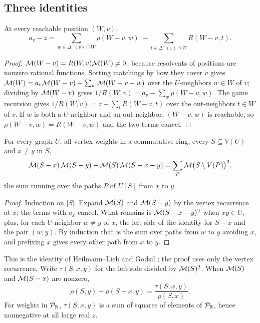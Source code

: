 \subsection{Three identities}

\begin{lemma}\label{lem:cavity}
At every reachable position $(W,v)$,
\[
a_v-z=\sum_{w\in\Delta^{-}(v)\cap W}\rho(W-v,w)\;-\sum_{t\in\Delta^{+}(v)\cap W}R(W-v,t).
\]
\end{lemma}
\begin{proof}
$\mathcal{M}(W-v)=R(W,v)\mathcal{M}(W)\neq0$, because resolvents of positions are nonzero rational functions. Sorting matchings by how they cover $v$ gives $\mathcal{M}(W)=a_v\mathcal{M}(W-v)-\sum_{w}\mathcal{M}(W-v-w)$ over the $U$-neighbors $w\in W$ of $v$; dividing by $\mathcal{M}(W-v)$ gives $1/R(W,v)=a_v-\sum_w\rho(W-v,w)$. The game recursion gives $1/R(W,v)=z-\sum_tR(W-v,t)$ over the out-neighbors $t\in W$ of $v$. If $w$ is both a $U$-neighbor and an out-neighbor, $(W-v,w)$ is reachable, so $\rho(W-v,w)=R(W-v,w)$ and the two terms cancel.
\end{proof}

\begin{lemma}\label{lem:two-point}
For every graph $U$, all vertex weights in a commutative ring, every $S\subseteq V(U)$ and $x\neq y$ in $S$,
\[
\mathcal{M}(S-x)\,\mathcal{M}(S-y)-\mathcal{M}(S)\,\mathcal{M}(S-x-y)=\sum_{P}\mathcal{M}\bigl(S\setminus V(P)\bigr)^{2},
\]
the sum running over the paths $P$ of $U[S]$ from $x$ to $y$.
\end{lemma}
\begin{proof}
Induction on $|S|$. Expand $\mathcal{M}(S)$ and $\mathcal{M}(S-y)$ by the vertex recurrence at $x$; the terms with $a_x$ cancel. What remains is $\mathcal{M}(S-x-y)^2$ when $xy\in U$, plus, for each $U$-neighbor $w\neq y$ of $x$, the left side of the identity for $S-x$ and the pair $(w,y)$. By induction that is the sum over paths from $w$ to $y$ avoiding $x$, and prefixing $x$ gives every other path from $x$ to $y$.
\end{proof}

This is the identity of Heilmann--Lieb and Godsil \cite{HeilmannLieb,GodsilBook}; the proof uses only the vertex recurrence. Write $\tau(S;x,y)$ for the left side divided by $\mathcal{M}(S)^2$. When $\mathcal{M}(S)$ and $\mathcal{M}(S-x)$ are nonzero,
\begin{equation}\label{eq:green-difference}
\rho(S,y)-\rho(S-x,y)=\frac{\tau(S;x,y)}{\rho(S,x)}.
\end{equation}
For weights in $\mathcal{P}_{\mathbb{R}}$, $\tau(S;x,y)$ is a sum of squares of elements of $\mathcal{P}_{\mathbb{R}}$, hence nonnegative at all large real $z$.

